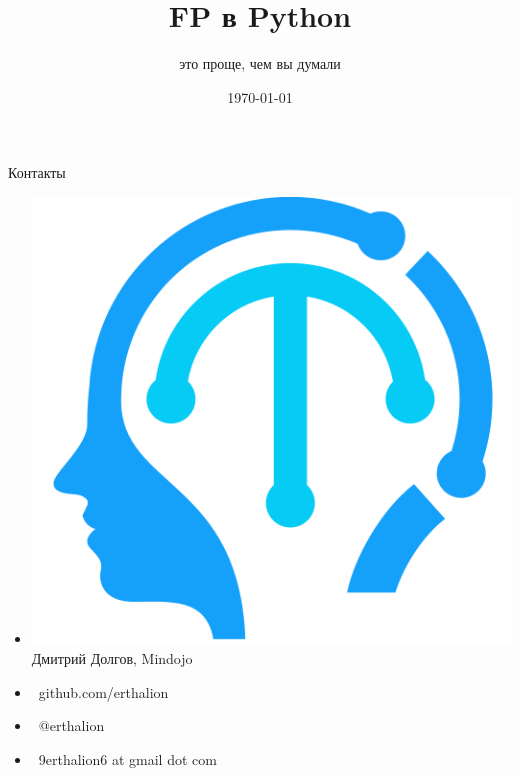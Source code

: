 \documentclass[18pt, compress]{beamer}
\title{FP в Python}
\subtitle{это проще, чем вы думали}
\date{\today}
\institute{}
\def\twitter{{\FA \faTwitter}}
\def\github{{\FA \faGithubSign}}
\def\email{{\FA \faEnvelope}}
\begin{document}
\fontsize{17pt}{18}\selectfont
\maketitle

\section{}

\begin{frame}{Контакты}
    \begin{itemize}[label={}]
        \item \includegraphics[scale=0.04]{mindojo_logo.png} Дмитрий Долгов, Mindojo
        \item {\github\ github.com/erthalion}
        \item {\twitter\ @erthalion}
        \item \email\ 9erthalion6 at gmail dot com
    \end{itemize}
\end{frame}
\end{document}
